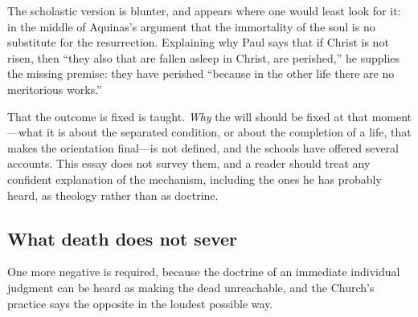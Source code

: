 The scholastic version is blunter, and appears where one would least look for it: in the middle of Aquinas's argument that the immortality of the soul is no substitute for the resurrection. Explaining why Paul says that if Christ is not risen, then ``they also that are fallen asleep in Christ, are perished,'' he supplies the missing premise: they have perished ``because in the other life there are no meritorious works.''

That the outcome is fixed is taught. \emph{Why} the will should be fixed at that moment---what it is about the separated condition, or about the completion of a life, that makes the orientation final---is not defined, and the schools have offered several accounts. This essay does not survey them, and a reader should treat any confident explanation of the mechanism, including the ones he has probably heard, as theology rather than as doctrine.

\subsection{What death does not sever}

One more negative is required, because the doctrine of an immediate individual judgment can be heard as making the dead unreachable, and the Church's practice says the opposite in the loudest possible way.

